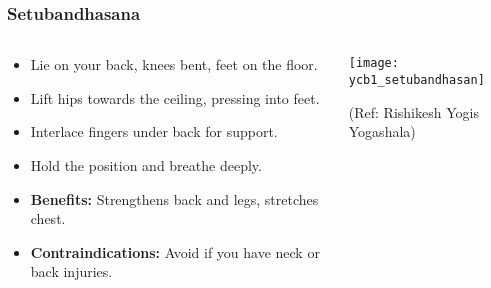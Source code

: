 
\begin{frame}[fragile]\frametitle{Setubandhasana}
\begin{columns}
    \begin{column}[T]{0.5\linewidth}
      \begin{itemize}
        \item Lie on your back, knees bent, feet on the floor.
        \item Lift hips towards the ceiling, pressing into feet.
        \item Interlace fingers under back for support.
        \item Hold the position and breathe deeply.
        \item \textbf{Benefits:} Strengthens back and legs, stretches chest.
        \item \textbf{Contraindications:} Avoid if you have neck or back injuries.
      \end{itemize}
    \end{column}
    \begin{column}[T]{0.5\linewidth}
        \begin{center}
        \begin{center}
		        \texttt{[image: ycb1\_setubandhasan]}
				
				{\tiny (Ref: Rishikesh Yogis Yogashala)}	        
		\end{center}   
        \end{center}    
    \end{column}
  \end{columns}
\end{frame}

